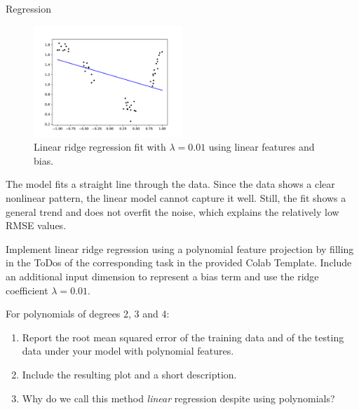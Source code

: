 \documentclass[
	english,
        solution=true
	]{tudaexercise}
\begin{document}
\begin{task}[points=34]{Regression}
\begin{subtask}[points=8, title=Linear Features]
\begin{solution}
            \begin{figure}[H]
                \centering
                \includegraphics[width=0.5\textwidth]{images/Task1a_4.png}
                \caption{Linear ridge regression fit with $\lambda = 0.01$ using linear features and bias.
                }
            \end{figure}

            The model fits a straight line through the data. Since the data shows a clear nonlinear pattern, the linear model cannot capture it well.
            Still, the fit shows a general trend and does not overfit the noise, which explains the relatively low RMSE values.

        \end{solution}

    \end{subtask}

    \begin{subtask}[points=8, title=Polynomial Features]
        Implement linear ridge regression using a polynomial feature projection by filling in the ToDos of the corresponding task in the provided Colab Template.
        Include an additional input dimension to represent a bias term and use the ridge coefficient $\lambda = 0.01$.

        For polynomials of degrees 2, 3 and 4:

        \begin{enumerate}
            \item Report the root mean squared error of the training data and of the testing data under your model with polynomial features.
            \item Include the resulting plot and a short description.
            \item Why do we call this method \textit{linear} regression despite using polynomials?
        \end{enumerate}


\end{subtask}
\end{task}
\end{document}
